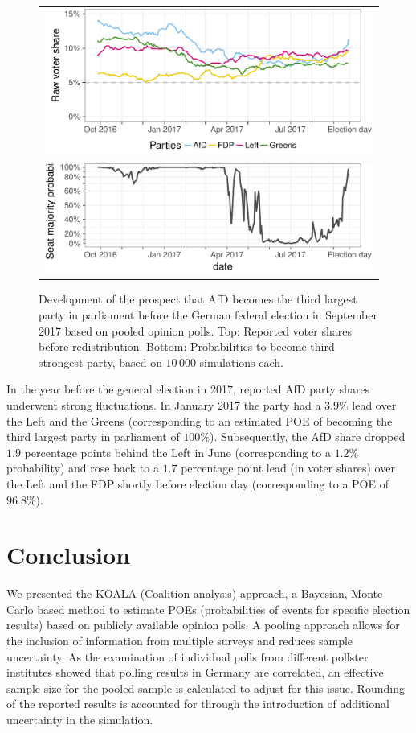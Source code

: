 \documentclass[smallcondensed]{svjour3}     %
\begin{document}
\begin{figure}[H]\centering
\begin{tabular}{l}
\includegraphics[height=.2\textwidth]{figures/2017_pooled_afd_rawShares.pdf}
\\
\includegraphics[height=.15\textwidth]{figures/2017_pooled_afd_thirdPartyProb.pdf}
\end{tabular}
\caption{Development of the prospect that AfD becomes the third largest party
in parliament before the German federal election in September 2017 based on pooled
opinion polls.
Top: Reported voter shares before redistribution.
Bottom: Probabilities to become third strongest party, based on $10\,000$ simulations each.
\label{fig:2017_afd}
}
\end{figure}

In the year before the general election in 2017, reported AfD party shares
underwent strong fluctuations. In January 2017 the party had a $3.9\%$ lead
over the Left and the Greens (corresponding to an estimated POE of
becoming the third largest party in parliament of $100\%$). Subsequently, the
AfD share dropped $1.9$ percentage points behind the Left in June
(corresponding to a $1.2\%$ probability)
and rose back to a $1.7$ percentage point lead (in voter shares) over the Left
and the FDP shortly before election day (corresponding to a POE of $96.8\%$).


\section{Conclusion} \label{sec:conclusion}
We presented the KOALA (Coalition analysis) approach, a Bayesian,
Monte Carlo based method to estimate POEs (probabilities of events for
specific election results) based on publicly available opinion polls.
A pooling approach allows for the inclusion of information from multiple
surveys and reduces sample uncertainty. As the examination of individual polls
from different pollster institutes showed that polling results in Germany are correlated,
an effective sample size for the pooled sample is calculated
to adjust for this issue. Rounding of the reported results is
accounted for through the introduction of additional uncertainty in the simulation. \\
\end{document}
